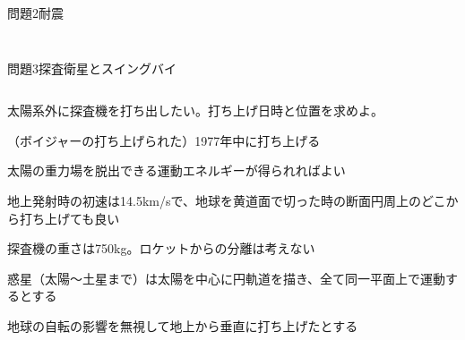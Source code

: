 \documentclass[dvipdfmx]{beamer}
\newenvironment{wideitemize}{\itemize\setlength{\itemsep}{1em}}{\enditemize}
\newenvironment{wideitemize2}{\itemize\setlength{\itemsep}{0.2em}}{\enditemize}
\begin{document}
\begin{frame}{問題2}{耐震}
\begin{columns}[t]
\begin{column}{0.3\textwidth}
\begin{figure}[htbp]
\end{figure}
\end{column}
\end{columns}
\end{frame}


\begin{frame}{問題3}{探査衛星とスイングバイ}
\begin{columns}[t]
\begin{column}{0.7\textwidth}
\begin{wideitemize}
	\item 太陽系外に探査機を打ち出したい。打ち上げ日時と位置を求めよ。
	\begin{wideitemize2}
		\item （ボイジャーの打ち上げられた）1977年中に打ち上げる
		\item 太陽の重力場を脱出できる運動エネルギーが得られればよい
		\item 地上発射時の初速は14.5km/sで、地球を黄道面で切った時の断面円周上のどこから打ち上げても良い
		\item 探査機の重さは750kg。ロケットからの分離は考えない
		\item 惑星（太陽～土星まで）は太陽を中心に円軌道を描き、全て同一平面上で運動するとする
		\item 地球の自転の影響を無視して地上から垂直に打ち上げたとする
	\end{wideitemize2}
\end{wideitemize}


\end{column}
\end{columns}
\end{frame}
\end{document}
